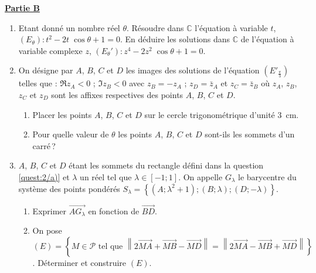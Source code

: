       \underline{\textbf{Partie B}} \newline
            \begin{enumerate}
                  \item Etant donn\'e un nombre r\'eel $\theta$.
                        R\'esoudre dans $\mathbb{C}$ l'\'equation \`a variable $t$,
                        $(E_\theta) : t^2 - 2t \; \cos \theta + 1 = 0$.
                        En d\'eduire les solutions dans $\mathbb{C}$ de l'\'equation \`a variable complexe $z$, $(E_\theta ') : z^4 - 2z^2 \; \cos \theta + 1 = 0$.
                  \item On d\'esigne par $A$, $B$, $C$ et $D$ les images des solutions de 
                        l'\'equation $\left( E'_{\frac{\pi}{3}} \right)$ telles que : 
                        $ \Re{z_A} < 0 $ ; $ \Im{z_B} < 0 $ avec $z_B = -z_A$ ; 
                        $z_D = \bar{z}_A$ et $z_C = \bar{z}_B$ o\`u $z_A$, $z_B$, $z_C$ et $z_D$ sont 
                        les affixes respectives des points $A$, $B$, $C$ et $D$.
                        \begin{enumerate}
                              \item Placer les points $A$, $B$, $C$ et $D$ sur le cercle trigonom\'etrique d'unit\'e 3~cm. 
                                    \label{quest:2/a)}
                              \item Pour quelle valeur de $\theta$ les points $A$, $B$, $C$ et $D$ sont-ils les sommets d'un carr\'e\,?
                        \end{enumerate}
                  \item $A$, $B$, $C$ et $D$ \'etant les sommets du rectangle d\'efini dans la question \ref{quest:2/a)} 
                        et $\lambda$ un r\'eel tel que $\lambda \in [-1 ; 1]$.
                        On appelle $G_\lambda$ le barycentre du syst\`eme des points pond\'er\'es
                        $S_\lambda = \left\lbrace (A ; \lambda^2 + 1) ; (B ; \lambda) ; (D ; -\lambda) \right\rbrace$.
                        \begin{enumerate}
                              \item Exprimer $\overrightarrow{AG_\lambda}$ en fonction de $\overrightarrow{BD}$.
                              \item On pose 
                              		$\scriptstyle{(E) = \left\lbrace 
                                    M \in \mathscr{P} \text{ tel que } 
                                    \left\| 2\overrightarrow{MA}+\overrightarrow{MB}-\overrightarrow{MD} \right\|
                                    = \left\| 2\overrightarrow{MA}-\overrightarrow{MB}+\overrightarrow{MD} \right\|
                                    \right\rbrace}$.
                                    D\'eterminer et construire $(E)$.
                        \end{enumerate}
            \end{enumerate}

